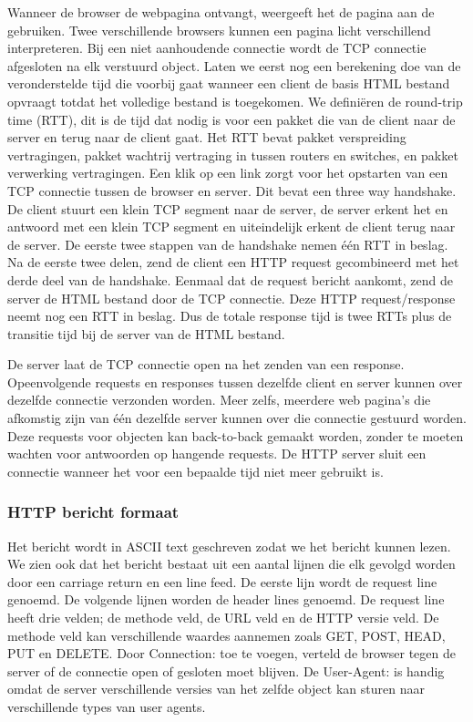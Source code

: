 Wanneer de browser de webpagina ontvangt, weergeeft het de pagina aan de gebruiken. Twee verschillende browsers kunnen een pagina licht verschillend interpreteren. Bij een niet aanhoudende connectie wordt de TCP connectie afgesloten na elk verstuurd object.
Laten we eerst nog een berekening doe van de veronderstelde tijd die voorbij gaat wanneer een client de basis HTML bestand opvraagt totdat het volledige bestand is toegekomen. We definiëren de round-trip time (RTT), dit is de tijd dat nodig is voor een pakket die van de client naar de server en terug naar de client gaat. Het RTT bevat pakket verspreiding vertragingen, pakket wachtrij vertraging in tussen routers en switches, en pakket verwerking vertragingen.
Een klik op een link zorgt voor het opstarten van een TCP connectie tussen de browser en server. Dit bevat een three way handshake. De client stuurt een klein TCP segment naar de server, de server erkent het en antwoord met een klein TCP segment en uiteindelijk erkent de client terug naar de server. De eerste twee stappen van de handshake nemen één RTT in beslag. Na de eerste twee delen, zend de client een HTTP request gecombineerd met het derde deel van de handshake. Eenmaal dat de request bericht aankomt, zend de server de HTML bestand door de TCP connectie. Deze HTTP request/response neemt nog een RTT in beslag. Dus de totale response tijd is twee RTTs plus de transitie tijd bij de server van de HTML bestand.


De server laat de TCP connectie open na het zenden van een response. Opeenvolgende requests en responses tussen dezelfde client en server kunnen over dezelfde connectie verzonden worden. Meer zelfs, meerdere web pagina’s die afkomstig zijn van één dezelfde server kunnen over die connectie gestuurd worden. Deze requests voor objecten kan back-to-back gemaakt worden, zonder te moeten wachten voor antwoorden op hangende requests. De HTTP server sluit een connectie wanneer het voor een bepaalde tijd niet meer gebruikt is.

\clearpage

\subsubsection{HTTP bericht formaat}


Het bericht wordt in ASCII text geschreven zodat we het bericht kunnen lezen. We zien ook dat het bericht bestaat uit een aantal lijnen die elk gevolgd worden door een carriage return en een line feed.
De eerste lijn wordt de request line genoemd. De volgende lijnen worden de header lines genoemd. De request line heeft drie velden; de methode veld, de URL veld en de HTTP versie veld. De methode veld kan verschillende waardes aannemen zoals GET, POST, HEAD, PUT en DELETE. Door Connection: toe te voegen, verteld de browser tegen de server of de connectie open of gesloten moet blijven. De User-Agent: is handig omdat de server verschillende versies van het zelfde object kan sturen naar verschillende types van user agents.

